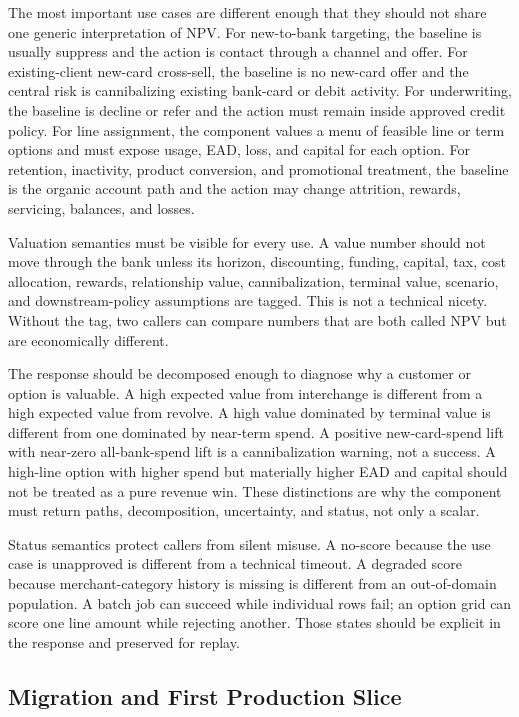 \documentclass[11pt]{article}
\newcommand{\1}{\mathbf{1}}
\begin{document}
The most important use cases are different enough that they should not share
one generic interpretation of NPV. For new-to-bank targeting, the baseline is
usually suppress and the action is contact through a channel and offer. For
existing-client new-card cross-sell, the baseline is no new-card offer and the
central risk is cannibalizing existing bank-card or debit activity. For
underwriting, the baseline is decline or refer and the action must remain
inside approved credit policy. For line assignment, the component values a
menu of feasible line or term options and must expose usage, EAD, loss, and
capital for each option. For retention, inactivity, product conversion, and
promotional treatment, the baseline is the organic account path and the action
may change attrition, rewards, servicing, balances, and losses.

Valuation semantics must be visible for every use. A value number should not
move through the bank unless its horizon, discounting, funding, capital, tax,
cost allocation, rewards, relationship value, cannibalization, terminal value,
scenario, and downstream-policy assumptions are tagged. This is not a
technical nicety. Without the tag, two callers can compare numbers that are
both called NPV but are economically different.

The response should be decomposed enough to diagnose why a customer or option
is valuable. A high expected value from interchange is different from a high
expected value from revolve. A high value dominated by terminal value is
different from one dominated by near-term spend. A positive new-card-spend
lift with near-zero all-bank-spend lift is a cannibalization warning, not a
success. A high-line option with higher spend but materially higher EAD and
capital should not be treated as a pure revenue win. These distinctions are
why the component must return paths, decomposition, uncertainty, and status,
not only a scalar.

Status semantics protect callers from silent misuse. A no-score because the
use case is unapproved is different from a technical timeout. A degraded score
because merchant-category history is missing is different from an
out-of-domain population. A batch job can succeed while individual rows fail;
an option grid can score one line amount while rejecting another. Those states
should be explicit in the response and preserved for replay.

\subsection{Migration and First Production Slice}
\label{sec:main-governance-migration}
\end{document}
